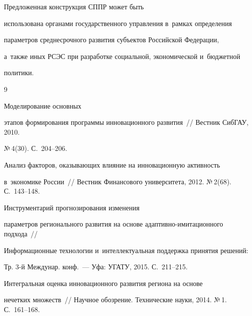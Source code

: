 Предложенная конструкция СППР может быть 


использована органами государственного управ\-ле\-ния в~рамках определения 


па\-ра\-мет\-ров среднесрочного развития субъектов Российской Федерации, 


а~также иных РСЭС при разработке социальной, экономической и~бюджетной 


политики. 





\vspace*{-2pt}


  


{\small\frenchspacing


{%




\begin{thebibliography}{9}




 Моделирование основных 


этапов формирования программы инновационного развития~/\!\!/ Вестник СибГАУ, 2010. 


№\,4(30). С.~204--206.




 Анализ факторов, оказывающих влияние на инновационную активность 


в~экономике России~/\!\!/ Вестник Финансового университета, 2012. №\,2(68). С.~143--148.




 Инструментарий прогнозирования изменения 


параметров регионального развития на основе адап\-тив\-но-ими\-та\-ци\-он\-но\-го подхода~/\!\!/ 


Информационные технологии и~интеллектуальная поддержка принятия решений: 


Тр. 3-й Междунар. конф.~--- Уфа: УГАТУ, 2015. С.~211--215.




 Интегральная оценка инновационного развития региона на основе 


нечетких множеств~/\!\!/ Научное обозрение. Технические науки, 2014. №\,1. С.~161--168.



\end{thebibliography}}}
